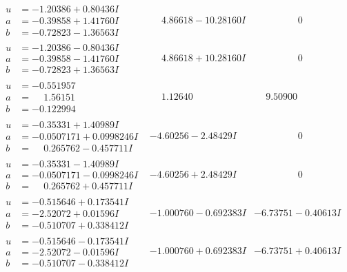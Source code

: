 \documentclass[1p]{elsarticle_modified}
\theoremstyle{definition}
\begin{document}
$$\begin{array}{c|c|c}
\begin{aligned}
u &= -1.20386 + 0.80436 I \\
a &= -0.39858 + 1.41760 I \\
b &= -0.72823 - 1.36563 I\end{aligned}
 & \phantom{-}4.86618 - 10.28160 I & \phantom{-0.000000 } 0 \\ \hline\begin{aligned}
u &= -1.20386 - 0.80436 I \\
a &= -0.39858 - 1.41760 I \\
b &= -0.72823 + 1.36563 I\end{aligned}
 & \phantom{-}4.86618 + 10.28160 I & \phantom{-0.000000 } 0 \\ \hline\begin{aligned}
u &= -0.551957\phantom{ +0.000000I} \\
a &= \phantom{-}1.56151\phantom{ +0.000000I} \\
b &= -0.122994\phantom{ +0.000000I}\end{aligned}
 & \phantom{-}1.12640\phantom{ +0.000000I} & \phantom{-}9.50900\phantom{ +0.000000I} \\ \hline\begin{aligned}
u &= -0.35331 + 1.40989 I \\
a &= -0.0507171 + 0.0998246 I \\
b &= \phantom{-}0.265762 - 0.457711 I\end{aligned}
 & -4.60256 - 2.48429 I & \phantom{-0.000000 } 0 \\ \hline\begin{aligned}
u &= -0.35331 - 1.40989 I \\
a &= -0.0507171 - 0.0998246 I \\
b &= \phantom{-}0.265762 + 0.457711 I\end{aligned}
 & -4.60256 + 2.48429 I & \phantom{-0.000000 } 0 \\ \hline\begin{aligned}
u &= -0.515646 + 0.173541 I \\
a &= -2.52072 + 0.01596 I \\
b &= -0.510707 + 0.338412 I\end{aligned}
 & -1.000760 - 0.692383 I & -6.73751 - 0.40613 I \\ \hline\begin{aligned}
u &= -0.515646 - 0.173541 I \\
a &= -2.52072 - 0.01596 I \\
b &= -0.510707 - 0.338412 I\end{aligned}
 & -1.000760 + 0.692383 I & -6.73751 + 0.40613 I\\

\end{array}$$
\end{document}
